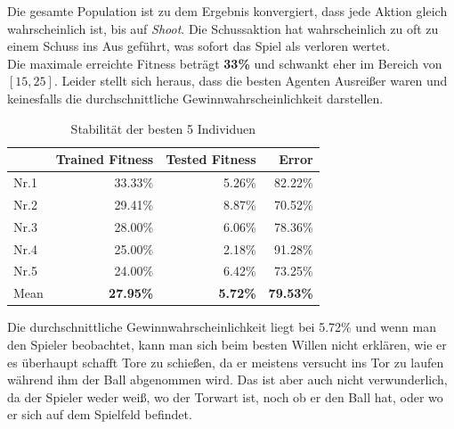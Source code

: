                \noindent
                Die gesamte Population ist zu dem Ergebnis konvergiert, dass jede Aktion gleich wahrscheinlich ist, bis auf \textit{Shoot}. Die Schussaktion hat wahrscheinlich zu oft zu einem Schuss ins Aus geführt, was sofort das Spiel als verloren wertet.\\

                \noindent
                Die maximale erreichte Fitness beträgt \textbf{33\%} und schwankt eher im Bereich von $[15,25]$. Leider stellt sich heraus, dass die besten Agenten Ausreißer waren und keinesfalls die durchschnittliche Gewinnwahrscheinlichkeit darstellen. \\[4mm]

                \begin{table}[H]
                    \begin{center}
                    \begin{tabular}{ |l|r|r|r| } 
                        \hline
                        \hfill & Trained Fitness   & Tested Fitness   &          Error    \\ \hline
                          Nr.1 &          33.33\%  &          5.26\%  &          82.22\%  \\  
                          Nr.2 &          29.41\%  &          8.87\%  &          70.52\%  \\  
                          Nr.3 &          28.00\%  &          6.06\%  &          78.36\%  \\ 
                          Nr.4 &          25.00\%  &          2.18\%  &          91.28\%  \\ 
                          Nr.5 &          24.00\%  &          6.42\%  &          73.25\%  \\ \hline
                          Mean &  \textbf{27.95\%} &  \textbf{5.72\%}  & \textbf{79.53\%} \\ \hline
                    \end{tabular}
                    \end{center}
                    \caption{Stabilität der besten 5 Individuen \label{fig:actiondisttable}}
                \end{table}
                \noindent
                Die durchschnittliche Gewinnwahrscheinlichkeit liegt bei 5.72\% und wenn man den Spieler beobachtet, kann man sich beim besten Willen nicht erklären, wie er es überhaupt schafft Tore zu schießen, da er meistens versucht ins Tor zu laufen während ihm der Ball abgenommen wird. Das ist aber auch nicht verwunderlich, da der Spieler weder weiß, wo der Torwart ist, noch ob er den Ball hat, oder wo er sich auf dem Spielfeld befindet. \\

